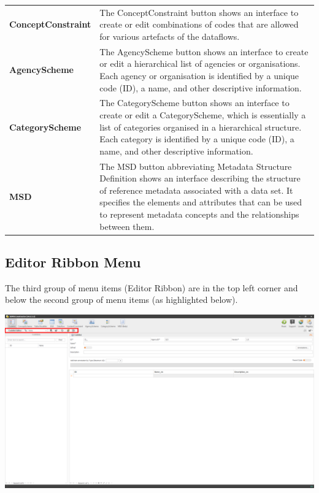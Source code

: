 \documentclass[
]{book}
\theoremstyle{definition}
\theoremstyle{definition}
\theoremstyle{definition}
\theoremstyle{definition}
\theoremstyle{remark}
\begin{document}
\begin{longtable}[]{@{}
  >{\raggedright\arraybackslash}p{}
  >{\raggedright\arraybackslash}p{}@{}}
\textbf{ConceptConstraint} & The ConceptConstraint button shows an interface to create or edit combinations of codes that are allowed for various artefacts of the dataflows. \\
\textbf{AgencyScheme} & The AgencyScheme button shows an interface to create or edit a hierarchical list of agencies or organisations. Each agency or organisation is identified by a unique code (ID), a name, and other descriptive information. \\
\textbf{CategoryScheme} & The CategoryScheme button shows an interface to create or edit a CategoryScheme, which is essentially a list of categories organised in a hierarchical structure. Each category is identified by a unique code (ID), a name, and other descriptive information. \\
\textbf{MSD} & The MSD button abbreviating Metadata Structure Definition shows an interface describing the structure of reference metadata associated with a data set. It specifies the elements and attributes that can be used to represent metadata concepts and the relationships between them. \\
\bottomrule()
\end{longtable}

\hypertarget{editor-ribbon-menu}{%
\subsection{Editor Ribbon Menu}\label{editor-ribbon-menu}}

The third group of menu items (Editor Ribbon) are in the top left corner and below the second group of menu items (as highlighted below).

\begin{center}\includegraphics[width=1\linewidth]{./images/image015} \end{center}
\end{document}
